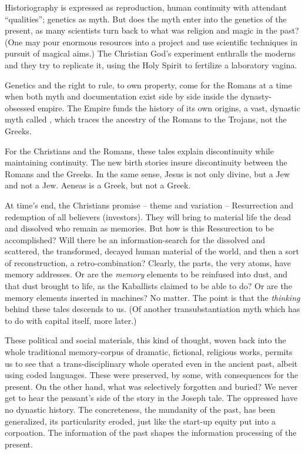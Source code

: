 \documentclass[11pt,twoside,draft]{memoir}
\begin{document}
Historiography is expressed as reproduction, human continuity with attendant \enquote{qualities}; genetics as myth. But does the myth enter into the genetics of the present,
as many scientists turn back to what was religion and magic in the past? (One may pour
enormous resources into a project and use
scientific techniques in pursuit of magical
aims.) The Christian God's experiment enthralls the moderns and they try to replicate
it, using the Holy Spirit to fertilize a laboratory vagina.

Genetics and the right to rule, to own
property, come for the Romans at a time
when both myth and documentation exist
side by side inside the dynasty-obsessed
empire. The Empire funds the history of its
own origins, a vast, dynastic myth called
, which traces the ancestry of the
Romans to the Trojans, not the Greeks.

For the Christians and the Romans, these
tales explain discontinuity while maintaining continuity. The new birth stories insure
discontinuity between the Romans and the
Greeks. In the same sense, Jesus is not only
divine, but a Jew and not a Jew. Aeneas is a
Greek, but not a Greek.

At time's end, the Christians promise -- 
theme and variation -- Resurrection and redemption of all believers (investors). They
will bring to material life the dead and
dissolved who remain as memories. But how
is this Ressurection to be accomplished?
Will there be an information-search for the
dissolved and scattered, the transformed,
decayed human material of the world, and
then a sort of reconstruction, a retro-combination? Clearly, the parts, the very atoms,
have memory addresses. Or are the \emph{memory}
elements to be reinfused into dust, and that
dust brought to life, as the Kaballists claimed
to be able to do? Or are the memory elements
inserted in machines? No matter. The point
is that the \emph{thinking} behind these tales descends to us. (Of another transubstantiation
myth which has to do with capital itself, more later.)

These political and social materials, this
kind of thought, woven back into the whole
traditional memory-corpus of dramatic, fictional, religious works, permits us to see that
a trans-disciplinary
whole operated even
in the ancient past, albeit using coded languages. These were preserved, by some, with
consequences for the present. On the other
hand, what was selectively forgotten and
buried? We never get to hear the peasant's
side of the story in the Joseph tale. The
oppressed have no dynastic history. The
concreteness, the mundanity of the past, has
been generalized, its particularity eroded,
just like the start-up equity put into a corpoation. The information of the past shapes
the information processing of the present.
\end{document}
